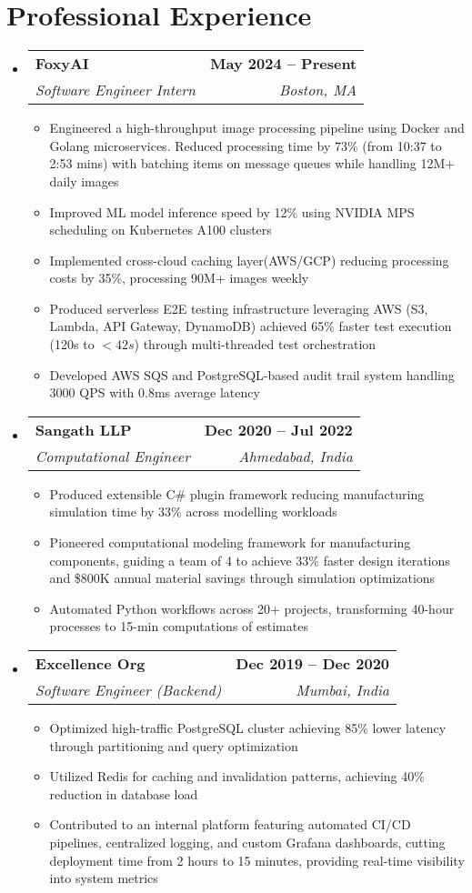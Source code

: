 \documentclass[letterpaper,11pt]{article}
\makeatletter
\newcommand{\preSecSpace}{-10pt}
\newcommand{\preItemSpace}{-10pt}
\newcommand{\itemspace}{-5pt}
\newcommand{\preSecVSpace}{\vspace{\preSecSpace}}
\newcommand{\itemVSpace}{\vspace{\itemspace}}
\newcommand{\expHeader}[4]{
    \item
    \begin{tabular*}{\textwidth}
        {l@{\extracolsep{\fill}}r}
        #1 & #2 \\
        #3 & #4 \\
    \end{tabular*}
    \itemVSpace
}
\newcommand{\resumeItem}[1]{
  \item\small{#1}
}
\newcommand{\sectionStart}{
    \begin{itemize}[
        leftmargin=0pt,
        label={},
        topsep=\preItemSpace,    %
        itemsep=2pt,   %
    ]
}
\newcommand{\sectionEnd}{
    \end{itemize}
}
\newcommand{\bulletStart}{
    \begin{itemize}[
        leftmargin=15pt,
        label={$\circ$},  %
        topsep=\preItemSpace,    %
        itemsep=0pt,   %
    ]
}
\newcommand{\bulletEnd}{
    \end{itemize}
}
\makeatother
\begin{document}
\section{Professional Experience}
    \sectionStart
        \expHeader {\textbf{FoxyAI}} {\textbf{\small{May 2024 -- Present}}} {\textit{Software Engineer Intern}} {\textit{Boston, MA}}
            \bulletStart
            \resumeItem {Engineered a high-throughput image processing pipeline using Docker and Golang microservices. Reduced
processing time by 73\% (from 10:37 to 2:53 mins) with batching items on message queues while handling 12M+ daily images}
            \resumeItem {Improved ML model inference speed by 12\% using NVIDIA MPS scheduling on Kubernetes A100 clusters}
            \resumeItem {Implemented cross-cloud caching layer(AWS/GCP) reducing processing costs by 35\%, processing 90M+ images weekly}
            \resumeItem {Produced serverless E2E testing infrastructure leveraging AWS (S3, Lambda, API Gateway, DynamoDB) achieved 65\% faster test execution (120s to $<42s$) through multi-threaded test orchestration}
            \resumeItem {Developed AWS SQS and PostgreSQL-based audit trail system handling 3000 QPS with 0.8ms average latency}
            \bulletEnd

        \expHeader {\textbf{Sangath LLP}} {\textbf{\small{Dec 2020 -- Jul 2022}}} {\textit{Computational Engineer}} {\textit{Ahmedabad, India}}
            \bulletStart
                \resumeItem {Produced extensible C\# plugin framework reducing manufacturing simulation time by 33\% across modelling workloads}
                \resumeItem {Pioneered computational modeling framework for manufacturing components, guiding a team of 4 to achieve 33\% faster design iterations and \$800K annual material savings through simulation optimizations}
                \resumeItem {Automated Python workflows across 20+ projects, transforming 40-hour processes to 15-min computations of estimates}
            \bulletEnd

        \expHeader {\textbf{Excellence Org}} {\textbf{\small{Dec 2019 -- Dec 2020}}} {\textit{Software Engineer (Backend)}} {\textit{Mumbai, India}}
            \bulletStart
                \resumeItem {Optimized high-traffic PostgreSQL cluster achieving 85\% lower latency through partitioning and query optimization}
                \resumeItem {Utilized Redis for caching and invalidation patterns, achieving 40\% reduction in database load}
                \resumeItem {Contributed to an internal platform featuring automated CI/CD pipelines, centralized logging, and custom Grafana dashboards, cutting deployment time from 2 hours to 15 minutes, providing real-time visibility into system metrics}
            \bulletEnd
    \sectionEnd
\end{document}
